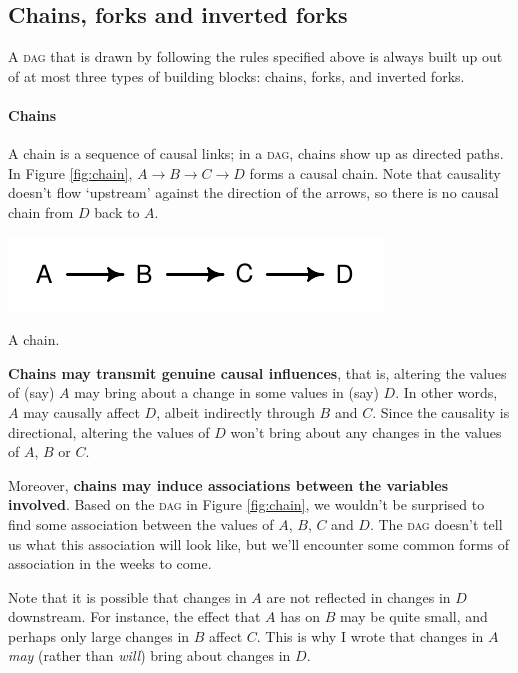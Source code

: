 \documentclass[a4paper]{tufte-book}\usepackage[]{graphicx}\usepackage[]{xcolor}
\begin{document}
\subsection{Chains, forks and inverted forks}

A \textsc{dag} that is drawn by following the rules specified above is always built up
out of at most three types of building blocks: chains, forks, and inverted forks.

\paragraph{Chains}
A chain is a sequence of causal links; in a \textsc{dag}, chains
show up as directed paths.
In Figure \ref{fig:chain},
$A \rightarrow B \rightarrow C \rightarrow D$ forms a causal chain.
Note that causality doesn't flow `upstream' against the direction of the arrows,
so there is no causal chain from $D$ back to $A$.

\begin{marginfigure}
\includegraphics[width=\textwidth]{figure/chain}
\caption{A chain.}
\label{fig:chain}
\end{marginfigure}

\textbf{Chains may transmit genuine causal influences}, that is, altering the values
of (say) $A$ may bring about a change in some values in (say) $D$. In other words,
$A$ may causally affect $D$, albeit indirectly through $B$ and $C$.
Since the causality is directional, altering the
values of $D$ won't bring about any changes in the values of $A$, $B$ or $C$.

Moreover, \textbf{chains may induce associations between the variables involved}.
Based on the \textsc{dag} in Figure \ref{fig:chain}, we wouldn't be surprised
to find some association
between the values of $A$, $B$, $C$ and $D$. The \textsc{dag}
doesn't tell us what this association will look like, but we'll encounter
some common forms of association in the weeks to come.

Note that it is possible that changes in $A$ are not reflected in changes
in $D$ downstream.
For instance, the effect that $A$ has on $B$ may be quite small,
and perhaps only large changes in $B$ affect $C$.
This is why I wrote that changes in $A$ \emph{may} (rather than \emph{will})
bring about changes in $D$.
\end{document}
